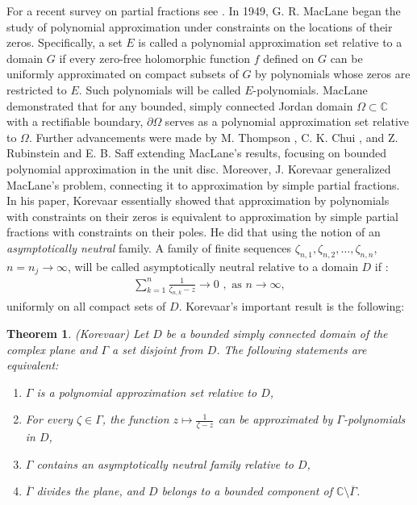 \documentclass{amsart}[11pt]
\newcommand{\C}{\mathbb{C}} %
\newcommand{\sbs}{\subset} %
\newcommand{\ra}{\rightarrow}
\newtheorem{theorem}{Theorem}[section]
\theoremstyle{definition}
\begin{document}
 For a recent survey on partial fractions see \cite{Danchenko2011}. In 1949, G. R. MacLane \cite{MacLane1949} began the study of polynomial approximation under constraints on the locations of their zeros. Specifically, a set $E$ is called a polynomial approximation set relative to a domain $G$ if every zero-free holomorphic function $f$ defined on $G$ can be uniformly approximated on compact subsets of $G$ by polynomials whose zeros are restricted to $E$. Such polynomials will be called $E$-polynomials. MacLane demonstrated that for any bounded, simply connected Jordan domain $\Omega \sbs \C$ with a rectifiable boundary, $\partial \Omega$ serves as a polynomial approximation set relative to $\Omega$. Further advancements were made by M. Thompson \cite{Thompson1967}, C. K. Chui \cite{Chui1969}, and Z. Rubinstein and E. B. Saff \cite{Rubinstein1971} extending MacLane’s results, focusing on bounded polynomial approximation in the unit disc. Moreover, J. Korevaar \cite{Korevaar1964} generalized MacLane’s problem, connecting it to approximation by simple partial fractions. In his paper, Korevaar essentially showed that approximation by polynomials with constraints on their zeros is equivalent to approximation by simple partial fractions with constraints on their poles. He did that using the notion of an \textit{asymptotically neutral} family. A family of finite sequences $\zeta_{n,1}, \zeta_{n,2}, \ldots, \zeta_{n,n}$, $n = n_j \ra \infty$, will be called asymptotically neutral relative to a domain $D$ if :
\begin{gather*}
    \sum_{k=1}^n \frac{1}{\zeta_{n,k} - z} \ra 0 \,\, ,\,\, \text{as}\,\, n \ra \infty,
\end{gather*}
uniformly on all compact sets of $D$. Korevaar's important result is the following:

\begin{theorem}{(Korevaar)}
Let $D$ be a bounded simply connected domain of the complex plane and $\Gamma $ a set disjoint from $D$. The following statements are equivalent:
\begin{enumerate}[label= (\roman*)]
    \item $\Gamma$ is a polynomial approximation set relative to $D$,
    \item For every $\zeta \in \Gamma $, the function $z \mapsto \frac{1}{\zeta - z}$ can be approximated by $\Gamma$-polynomials in $D$,
    \item $\Gamma$ contains an asymptotically neutral family relative to $D$,
    \item $\overline{\Gamma}$ divides the plane, and $D$ belongs to a bounded component of $\C \setminus \overline{\Gamma}$.
\end{enumerate}
\end{theorem}
\end{document}
